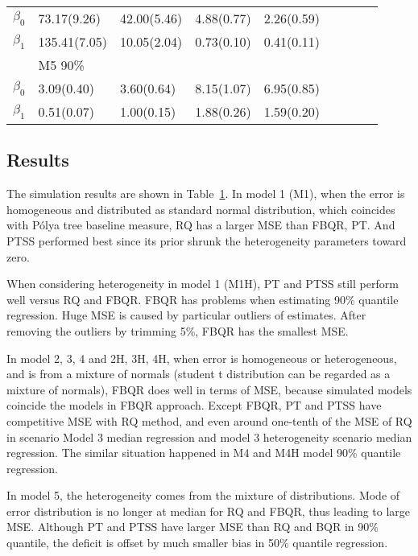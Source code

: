\documentclass[12pt]{article}
\newcommand{\polya}{P\'{o}lya}
\begin{document}
\begin{center}
\begin{table}[h]
\begin{tabular}[tb]{c|llll|llll}
      $\beta_0$ & 73.17(9.26)   & 42.00(5.46)  & 4.88(0.77)  & 2.26(0.59)  &               &             &                           \\
      $\beta_1$ & 135.41(7.05)  & 10.05(2.04)  & 0.73(0.10)  & 0.41(0.11)  &               &             &                           \\
                & M5 90\%       &              &             &             &               &             &             &             \\
      $\beta_0$ & 3.09(0.40)    & 3.60(0.64)   & 8.15(1.07)  & 6.95(0.85)  &               &             &                           \\
      $\beta_1$ & 0.51(0.07)    & 1.00(0.15)   & 1.88(0.26)  & 1.59(0.20)  &               &             &                           \\
\hline
    \end{tabular}
    \label{tab:m1}
  \end{table}
\end{center}

\subsection{Results}
The simulation results are shown in Table~\ref{tab:m1}.  In model 1
(M1), when the error is homogeneous and distributed as standard normal
distribution, which coincides with \polya{} tree baseline measure, RQ
has a larger MSE than FBQR, PT. And PTSS performed best since its
prior shrunk the heterogeneity parameters toward zero.

When considering heterogeneity in model 1 (M1H), PT and PTSS still
perform well versus RQ and FBQR. FBQR has problems when estimating
90\% quantile regression. Huge MSE is caused by particular outliers of
estimates. After removing the outliers by trimming 5\%, FBQR has the
smallest MSE.

In model 2, 3, 4 and 2H, 3H, 4H, when error is homogeneous or
heterogeneous, and is from a mixture of normals (student t
distribution can be regarded as a mixture of normals), FBQR does well
in terms of MSE, because simulated models coincide the models in FBQR
approach. Except FBQR, PT and PTSS have competitive MSE with RQ
method, and even around one-tenth of the MSE of RQ in scenario Model 3
median regression and model 3 heterogeneity scenario median
regression. The similar situation happened in M4 and M4H model 90\%
quantile regression.

In model 5, the heterogeneity comes from the mixture of distributions.
Mode of error distribution is no longer at median for RQ and FBQR,
thus leading to large MSE. Although PT and PTSS have larger MSE than RQ
and BQR in 90\% quantile, the deficit is offset by much smaller bias in 50\%
quantile regression.
\end{document}
